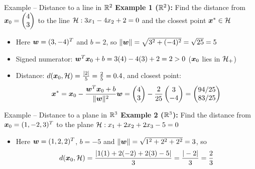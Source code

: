 \documentclass[aspectratio=169]{beamer}\usepackage[]{graphicx}\usepackage[]{xcolor}
\begin{document}
\begin{frame}{Example -- Distance to a line in $\mathbb{R}^2$}
    \textbf{Example 1 ($\mathbb{R}^2$):} Find the distance from $\bm{x}_0 = \begin{pmatrix} 4 \\ 3 \end{pmatrix}$ to the line $\mathcal{H}: 3x_1 - 4x_2 + 2 = 0$ and the closest point $\bm{x}^* \in \mathcal{H}$
    \begin{itemize}
        \item Here $\bm{w} = (3, -4)^T$ and $b = 2$, so $\|\bm{w}\| = \sqrt{3^2 + (-4)^2} = \sqrt{25} = 5$
        \item Signed numerator: $\bm{w}^T \bm{x}_0 + b = 3(4) - 4(3) + 2 = 2 > 0$ ($\bm{x}_0$ lies in $\mathcal{H}_+$)
        \item Distance: $d(\bm{x}_0, \mathcal{H}) = \frac{|2|}{5} = \frac{2}{5} = 0.4$, and closest point:
        \[
            \bm{x}^* = \bm{x}_0 - \frac{\bm{w}^T \bm{x}_0 + b}{\|\bm{w}\|^2}\bm{w} = \begin{pmatrix} 4 \\ 3 \end{pmatrix} - \frac{2}{25}\begin{pmatrix} 3 \\ -4 \end{pmatrix} = \begin{pmatrix} 94/25 \\ 83/25 \end{pmatrix}
        \]
    \end{itemize}
\end{frame}

\begin{frame}{Example -- Distance to a plane in $\mathbb{R}^3$}
    \textbf{Example 2 ($\mathbb{R}^3$):} Find the distance from $\bm{x}_0 = (1, -2, 3)^T$ to the plane $\mathcal{H}: x_1 + 2x_2 + 2x_3 - 5 = 0$
    \begin{itemize}
        \item Here $\bm{w} = (1, 2, 2)^T$, $b = -5$ and $\|\bm{w}\| = \sqrt{1^2 + 2^2 + 2^2} = 3$, so
        \[
            d(\bm{x}_0, \mathcal{H}) = \frac{|1(1) + 2(-2) + 2(3) - 5|}{3} = \frac{|-2|}{3} = \frac{2}{3}
        \]
    \end{itemize}
\end{frame}


\end{document}
